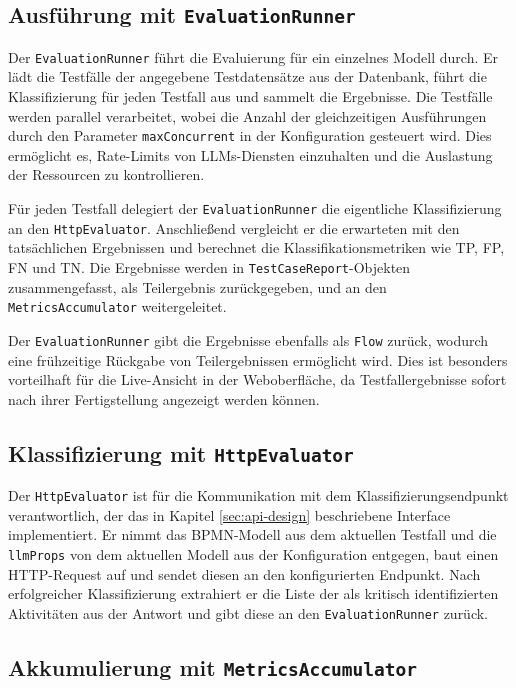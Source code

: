 \subsection*{Ausführung mit \texttt{EvaluationRunner}}

Der \texttt{EvaluationRunner} führt die Evaluierung für ein einzelnes Modell durch. Er lädt die Testfälle der angegebene Testdatensätze aus der Datenbank, führt die Klassifizierung für jeden Testfall aus und sammelt die Ergebnisse. Die Testfälle werden parallel verarbeitet, wobei die Anzahl der gleichzeitigen Ausführungen durch den Parameter \texttt{maxConcurrent} in der Konfiguration gesteuert wird. Dies ermöglicht es, Rate-Limits von \acp{LLM}-Diensten einzuhalten und die Auslastung der Ressourcen zu kontrollieren.

Für jeden Testfall delegiert der \texttt{EvaluationRunner} die eigentliche Klassifizierung an den \texttt{HttpEvaluator}. Anschließend vergleicht er die erwarteten mit den tatsächlichen Ergebnissen und berechnet die Klassifikationsmetriken wie \ac{TP}, \ac{FP}, \ac{FN} und \ac{TN}. Die Ergebnisse werden in \texttt{TestCaseReport}-Objekten zusammengefasst, als Teilergebnis zurückgegeben, und an den \texttt{MetricsAccumulator} weitergeleitet.

Der \texttt{EvaluationRunner} gibt die Ergebnisse ebenfalls als \texttt{Flow} zurück, wodurch eine frühzeitige Rückgabe von Teilergebnissen ermöglicht wird. Dies ist besonders vorteilhaft für die Live-Ansicht in der Weboberfläche, da Testfallergebnisse sofort nach ihrer Fertigstellung angezeigt werden können.

\subsection*{Klassifizierung mit \texttt{HttpEvaluator}}

Der \texttt{HttpEvaluator} ist für die Kommunikation mit dem Klassifizierungsendpunkt verantwortlich, der das in Kapitel \ref{sec:api-design} beschriebene Interface implementiert. Er nimmt das \ac{BPMN}-Modell aus dem aktuellen Testfall und die \texttt{llmProps} von dem aktuellen Modell aus der Konfiguration entgegen, baut einen HTTP-Request auf und sendet diesen an den konfigurierten Endpunkt. Nach erfolgreicher Klassifizierung extrahiert er die Liste der als kritisch identifizierten Aktivitäten aus der Antwort und gibt diese an den \texttt{EvaluationRunner} zurück.

\subsection*{Akkumulierung mit \texttt{MetricsAccumulator}}

